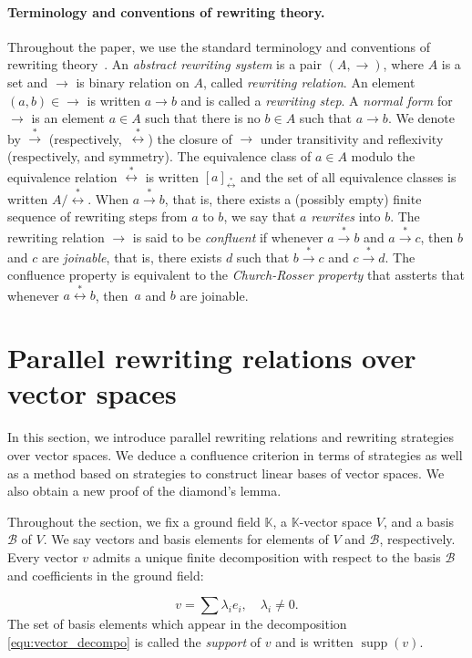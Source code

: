 \documentclass[11pt]{article}
\theoremstyle{definition}
\newcommand\basis{\mathscr{B}}
\DeclareMathOperator{\supp}{supp}
\newcommand\K{\mathbb{K}}
\newcommand\transRew{\overset{*}{\to}}
\newcommand\rewEquiv{\overset{*}{\leftrightarrow}}
\begin{document}
\paragraph{Terminology and conventions of rewriting theory.}

Throughout the paper, we use the standard terminology and conventions of
rewriting theory~\cite{MR1629216}. An {\em abstract rewriting system} is
a pair $(A,\to)$, where $A$ is a set and $\to$ is binary relation on $A$,
called {\em rewriting relation}. An element~$(a,b)\in\to$ is written
$a\to b$ and is called a {\em rewriting step}. A {\em normal form} for
$\to$ is an element $a\in A$ such that there is no $b\in A$ such that
$a\to b$. We denote by $\transRew$  (respectively,~$\rewEquiv$) the
closure of $\to$ under transitivity and reflexivity (respectively, and
symmetry). The equivalence class of $a\in A$ modulo the equivalence
relation $\rewEquiv$ is written $[a]_{\rewEquiv}$ and the set of all
equivalence classes is written $A/\rewEquiv$. When $a\transRew b$, that
is, there exists a (possibly empty) finite sequence of rewriting steps
from $a$ to  $b$, we say that $a$ {\em rewrites} into $b$. The rewriting
relation $\to$ is said to be {\em confluent} if whenever $a\transRew b$
and $a\transRew c$, then $b$ and $c$ are {\em joinable}, that is, there
exists $d$ such that $b\transRew c$ and $c\transRew d$. The confluence
property is equivalent to the {\em Church-Rosser property} that assterts
that whenever $a\rewEquiv b$, then~$a$ and $b$ are joinable.

\section{Parallel rewriting relations over vector spaces}
\label{sec:parallel_rewriting_relations_over_vector_space}

In this section, we introduce parallel rewriting relations and rewriting
strategies over vector spaces. We deduce a confluence criterion in terms
of strategies as well as a method based on strategies to construct linear
bases of vector spaces. We also obtain a new proof of the diamond's
lemma.
\medskip

Throughout the section, we fix a ground field $\K$, a $\K$-vector space
$V$, and a basis $\basis$ of $V$. We say vectors and basis elements for
elements of $V$ and $\basis$, respectively. Every vector $v$ admits a
unique finite decomposition with respect to the basis $\basis$ and
coefficients in the ground field:

\begin{equation}\label{equ:vector_decompo}
  v=\sum\lambda_ie_i,\quad\lambda_i\neq 0.
\end{equation}
The set of basis elements which appear in the decomposition
\eqref{equ:vector_decompo} is called the {\it support} of $v$ and is
written $\supp(v)$. 
\end{document}
